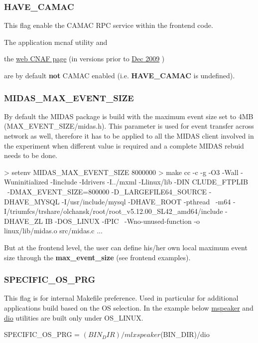  \hypertarget{BuildingOptions_BO_HAVE_CAMAC}{}\subsubsection{HAVE\_\-CAMAC}\label{BuildingOptions_BO_HAVE_CAMAC}
This flag enable the CAMAC RPC service within the frontend code.
\begin{DoxyItemize}
\item The application mcnaf utility and
\item the \hyperlink{RC_mhttpd_CNAF_page}{web CNAF page} (in versions prior to \hyperlink{NDF_ndf_dec_2009}{Dec 2009} )
\end{DoxyItemize}

are by default {\bfseries not} CAMAC enabled (i.e. {\bfseries HAVE\_\-CAMAC} is undefined).

\label{BuildingOptions_idx_event_size_build-flag}
\hypertarget{BuildingOptions_idx_event_size_build-flag}{}
 

 \hypertarget{BuildingOptions_BO_MIDAS_MAX_EVENT_SIZE}{}\subsubsection{MIDAS\_\-MAX\_\-EVENT\_\-SIZE}\label{BuildingOptions_BO_MIDAS_MAX_EVENT_SIZE}
By default the MIDAS package is build with the maximum event size set to 4MB (MAX\_\-EVENT\_\-SIZE/midas.h). This parameter is used for event transfer across network as well, therefore it has to be applied to all the MIDAS client involved in the experiment when different value is required and a complete MIDAS rebuid needs to be done. 
\begin{DoxyCode}
> setenv MIDAS_MAX_EVENT_SIZE 8000000
> make
cc -c -g -O3 -Wall -Wuninitialized -Iinclude -Idrivers -I../mxml -Llinux/lib -DIN
      CLUDE_FTPLIB  \
 -DMAX_EVENT_SIZE=800000 -D_LARGEFILE64_SOURCE -DHAVE_MYSQL -I/usr/include/mysql 
      -DHAVE_ROOT -pthread \
-m64 -I/triumfcs/trshare/olchansk/root/root_v5.12.00_SL42_amd64/include -DHAVE_ZL
      IB -DOS_LINUX -fPIC \
-Wno-unused-function -o linux/lib/midas.o src/midas.c
...
\end{DoxyCode}
 But at the frontend level, the user can define his/her own local maximum event size through the {\bfseries max\_\-event\_\-size} (see frontend examples).



 \hypertarget{BuildingOptions_BO_SPECIFIC_OS_PRG}{}\subsubsection{SPECIFIC\_\-OS\_\-PRG}\label{BuildingOptions_BO_SPECIFIC_OS_PRG}
This flag is for internal Makefile preference. Used in particular for additional applications build based on the OS selection. In the example below \hyperlink{F_Messaging_F_mspeaker_utility}{mspeaker} and \hyperlink{FE_utils_FE_dio_utility}{dio} utilities are built only under OS\_\-LINUX. 
\begin{DoxyCode}
SPECIFIC_OS_PRG = $(BIN_DIR)/mlxspeaker $(BIN_DIR)/dio
\end{DoxyCode}


